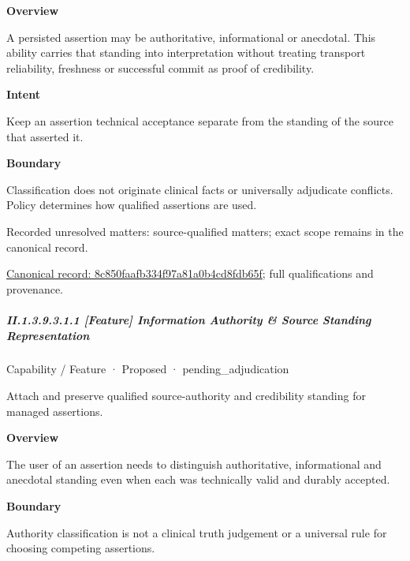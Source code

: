 \textbf{Overview}



A persisted assertion may be authoritative, informational or anecdotal. This ability carries that standing into interpretation without treating transport reliability, freshness or successful commit as proof of credibility.



\textbf{Intent}



Keep an assertion technical acceptance separate from the standing of the source that asserted it.



\textbf{Boundary}



Classification does not originate clinical facts or universally adjudicate conflicts. Policy determines how qualified assertions are used.


{\small Recorded unresolved matters: source-qualified matters; exact scope remains in the canonical record.}\par
{\footnotesize \href{../../../../continuum/strategy/capability/8c850faafb334f97a81a0b4cd8fdb65f.md}{Canonical record: 8c850faafb334f97a81a0b4cd8fdb65f}; full qualifications and provenance.}\par
\subparagraph*{II.1.3.9.3.1.1 [Feature] Information Authority \& Source Standing Representation}
\label{navigation:II.1.3.9.3.1.1}

\label{element:70a444156cd246cb97608a782e4bdea8}
{\small Capability / Feature · Proposed · pending\_adjudication}\par

Attach and preserve qualified source-authority and credibility standing for managed assertions.



\textbf{Overview}



The user of an assertion needs to distinguish authoritative, informational and anecdotal standing even when each was technically valid and durably accepted.



\textbf{Boundary}



Authority classification is not a clinical truth judgement or a universal rule for choosing competing assertions.


